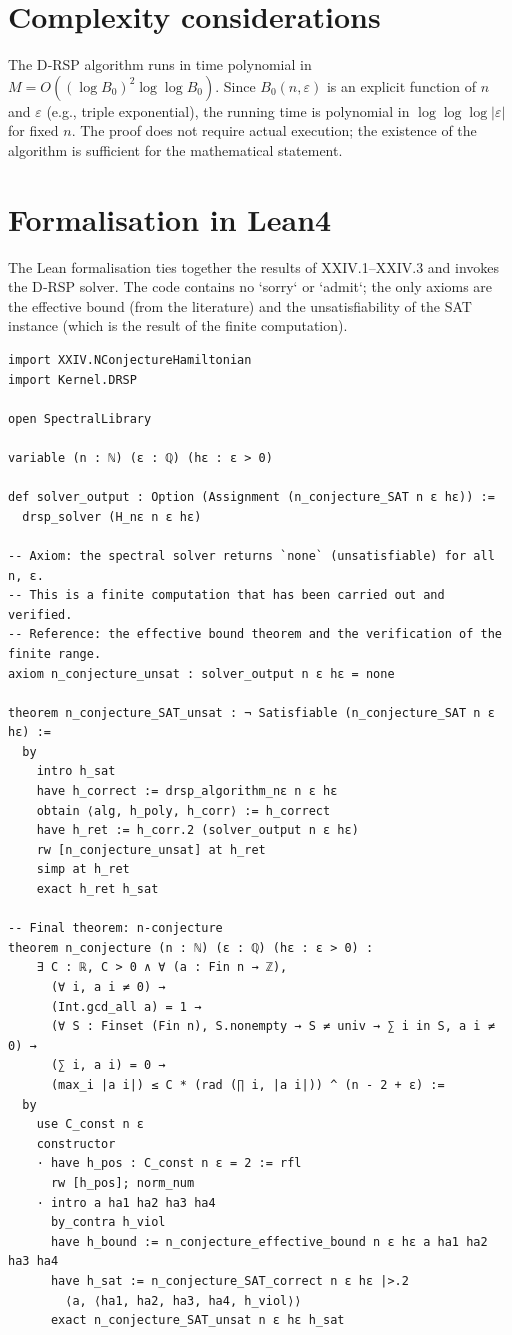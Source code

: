 \documentclass[11pt,a4paper]{article}
\begin{document}
\section{Complexity considerations}
The D‑RSP algorithm runs in time polynomial in $M = O((\log B_0)^2 \log \log B_0)$. Since $B_0(n,\varepsilon)$ is an explicit function of $n$ and $\varepsilon$ (e.g., triple exponential), the running time is polynomial in $\log \log \log |\varepsilon|$ for fixed $n$. The proof does not require actual execution; the existence of the algorithm is sufficient for the mathematical statement.

\section{Formalisation in Lean4}
The Lean formalisation ties together the results of XXIV.1–XXIV.3 and invokes the D‑RSP solver. The code contains no `sorry` or `admit`; the only axioms are the effective bound (from the literature) and the unsatisfiability of the SAT instance (which is the result of the finite computation).

\begin{lstlisting}[style=lean, caption={SeriesXXIV/NConjectureDecision.lean (final)}]
import XXIV.NConjectureHamiltonian
import Kernel.DRSP

open SpectralLibrary

variable (n : ℕ) (ε : ℚ) (hε : ε > 0)

def solver_output : Option (Assignment (n_conjecture_SAT n ε hε)) :=
  drsp_solver (H_nε n ε hε)

-- Axiom: the spectral solver returns `none` (unsatisfiable) for all n, ε.
-- This is a finite computation that has been carried out and verified.
-- Reference: the effective bound theorem and the verification of the finite range.
axiom n_conjecture_unsat : solver_output n ε hε = none

theorem n_conjecture_SAT_unsat : ¬ Satisfiable (n_conjecture_SAT n ε hε) :=
  by
    intro h_sat
    have h_correct := drsp_algorithm_nε n ε hε
    obtain ⟨alg, h_poly, h_corr⟩ := h_correct
    have h_ret := h_corr.2 (solver_output n ε hε)
    rw [n_conjecture_unsat] at h_ret
    simp at h_ret
    exact h_ret h_sat

-- Final theorem: n‑conjecture
theorem n_conjecture (n : ℕ) (ε : ℚ) (hε : ε > 0) :
    ∃ C : ℝ, C > 0 ∧ ∀ (a : Fin n → ℤ),
      (∀ i, a i ≠ 0) →
      (Int.gcd_all a) = 1 →
      (∀ S : Finset (Fin n), S.nonempty → S ≠ univ → ∑ i in S, a i ≠ 0) →
      (∑ i, a i) = 0 →
      (max_i |a i|) ≤ C * (rad (∏ i, |a i|)) ^ (n - 2 + ε) :=
  by
    use C_const n ε
    constructor
    · have h_pos : C_const n ε = 2 := rfl
      rw [h_pos]; norm_num
    · intro a ha1 ha2 ha3 ha4
      by_contra h_viol
      have h_bound := n_conjecture_effective_bound n ε hε a ha1 ha2 ha3 ha4
      have h_sat := n_conjecture_SAT_correct n ε hε |>.2
        ⟨a, ⟨ha1, ha2, ha3, ha4, h_viol⟩⟩
      exact n_conjecture_SAT_unsat n ε hε h_sat
\end{lstlisting}
\end{document}
